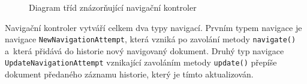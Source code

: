 \begin{figure}[H]
  \begin{center}
    \caption{Diagram tříd znázorňující navigační kontroler}
    \label{Figure.NavigationController}
  \end{center}
\end{figure}

\vspace{-1em}

Navigační kontroler vytváří celkem dva typy navigací. Prvním typem navigace je navigace \texttt{NewNavigationAttempt}, která vzniká po zavolání metody \texttt{navigate()} a~která přidává do historie nový navigovaný dokument. Druhý typ navigace \texttt{UpdateNavigationAttempt} vznikající zavoláním metody \texttt{update()} přepíše dokument předaného záznamu historie, který je tímto aktualizován.


